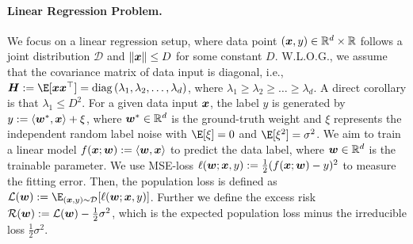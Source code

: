 \paragraph{Linear Regression Problem.} We focus on a linear regression setup, where data point $({\bm{x}},y) \in \mathbb{R}^{d}\times\mathbb{R}$ follows a joint distribution $\mathcal{D}$ and $\|{\bm{x}}\|\leq D$ for some constant $D$. W.L.O.G., we assume that the covariance matrix of data input is diagonal, i.e., $\mH := \E[\vx\vx^\top] = \diag \left(\lambda_1, \lambda_2, \dots, \lambda_{d}\right) $, where $\lambda_1 \geq \lambda_2 \geq \dots \geq \lambda_{d}$. A direct corollary is that $\lambda_1 \leq D^2$. For a given data input ${\bm{x}}$, the label $y$ is generated by $y:= \langle {\bm{w}}^*, {\bm{x}} \rangle + \xi$, where ${\bm{w}}^* \in \mathbb{R}^{d}$ is the ground-truth weight and $\xi$ represents the independent random label noise with $\E[\xi] = 0$ and $\E[\xi^2] = \sigma^2$. We aim to train a linear model $f({\bm{x}}; {\bm{w}}):=\langle {\bm{w}}, {\bm{x}} \rangle$ to predict the data label, where ${\bm{w}} \in \mathbb{R}^{d}$ is the trainable parameter. We use MSE-loss $\ell({\bm{w}}; {\bm{x}}, y):=\frac{1}{2}(f({\bm{x}}; {\bm{w}})-y)^2$ to measure the fitting error. Then, the population loss is defined as $\cL(\vw):= \E_{(\vx, y) \sim \cD}[\ell(\vw;\vx, y)]$. Further we define the excess risk $\mathcal{R}({\bm{w}}) := \mathcal{L}({\bm{w}}) - \frac{1}{2}\sigma^2$, which is the expected population loss minus the irreducible loss $\frac{1}{2}\sigma^2$.


